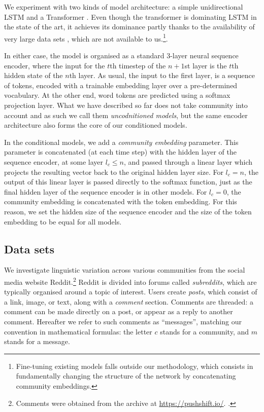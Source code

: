 \documentclass[11pt]{article}
\begin{document}
We experiment with two kinds of model architecture: a simple
unidirectional LSTM \citep{Hochreiter1997} and a Transformer
\citep{Vaswani2017}. Even though the transformer is dominating LSTM in
the state of the art, it achieves its dominance partly thanks to the
availability of very large data sets ,
which are not available to us.\footnote{Fine-tuning existing models
  falls outside our methodology, which consists in fundamentally
  changing the structure of the network by concatenating
  community embeddings.}. 

In either case, the model is organised as a
standard $3$-layer neural sequence encoder, where the input for the
$t$th timestep of the $n+1$st layer is the $t$th hidden state of the 
$n$th layer.
As usual, the input to the first layer, is a sequence of tokens,
encoded with a trainable embedding layer over a pre-determined vocabulary.
At the other end, word tokens are predicted using a softmax projection 
layer. What we have described so far does not take community into account
and as such we call them \emph{uncodnitioned models}, but the same
encoder architecture also forms the core of our conditioned models.

In the conditional models, we add a \emph{community embedding} parameter.
This parameter is concatenated (at each time step) with the hidden layer of the
sequence encoder, at some layer $l_c \leq n$, and passed through a
linear layer which projects the resulting vector back to the original
hidden layer size.  For $l_c = n$, the output of this linear layer is
passed directly to the softmax function, just as the final hidden
layer of the sequence encoder is in other models.  For $l_c=0$, the
community embedding is concatenated with the token embedding.  For
this reason, we set the hidden size of the sequence encoder and the
size of the token embedding to be equal for all models.


\subsection{Data sets}

We investigate linguistic variation across various communities 
from the social media website Reddit.\footnote{Comments were obtained
  from the archive at \url{https://pushshift.io/}.
  \cite{Baumgartner2020}.}
%
Reddit is divided into forums called \textit{subreddits}, 
which are typically organised around a topic of interest. 
Users create \textit{posts}, which consist of a link, image, 
or text, along with a \emph{comment} section. 
Comments are threaded: a comment can be made directly on a post,
or appear as a reply to another comment.
%
Hereafter we refer to such comments as ``messages'', matching our
convention in mathematical formulas: the letter $c$ stands for a
community, and $m$ stands for a message.
\end{document}
